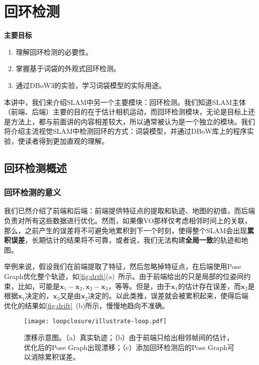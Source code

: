 \chapter{回环检测}
\begin{mdframed}  
	\textbf{主要目标}
	\begin{enumerate}[labelindent=0em,leftmargin=1.5em]
		\item 理解回环检测的必要性。
		\item 掌握基于词袋的外观式回环检测。
		\item 通过DBoW3的实验，学习词袋模型的实际用途。
	\end{enumerate}
\end{mdframed}

本讲中，我们来介绍SLAM中另一个主要模块：回环检测。我们知道SLAM主体（前端、后端）主要的目的在于估计相机运动，而回环检测模块，无论是目标上还是方法上，都与前面讲的内容相差较大，所以通常被认为是一个独立的模块。我们将介绍主流视觉SLAM中检测回环的方式：词袋模型，并通过DBoW库上的程序实验，使读者得到更加直观的理解。

\newpage


\newpage 

\section{回环检测概述}
\subsection{回环检测的意义}
我们已然介绍了前端和后端：前端提供特征点的提取和轨迹、地图的初值，而后端负责对所有这些数据进行优化。然而，如果像VO那样仅考虑相邻时间上的关联，那么，之前产生的误差将不可避免地累积到下一个时刻，使得整个SLAM会出现\textbf{累积误差}，长期估计的结果将不可靠，或者说，我们无法构建\textbf{全局一致}的轨迹和地图。

举例来说，假设我们在前端提取了特征，然后忽略掉特征点，在后端使用Pose Graph优化整个轨迹，如\autoref{fig:drift}(a)~所示。由于前端给出的只是局部的位姿间约束，比如，可能是$\bm{x}_1 - \bm{x}_2, \bm{x}_2-\bm{x}_3$，等等。但是，由于$\bm{x}_1$的估计存在误差，而$\bm{x}_2$是根据$\bm{x}_1$决定的，$\bm{x}_3$又是由$\bm{x}_2$决定的。以此类推，误差就会被累积起来，使得后端优化的结果如\autoref{fig:drift}~(b)所示，慢慢地趋向不准确。

\begin{figure}[!htp]
	\centering
	\texttt{[image: loopclosure/illustrate-loop.pdf]}
	\caption{漂移示意图。（a）真实轨迹；（b）由于前端只给出相邻帧间的估计，优化后的Pose Graph出现漂移；（c）添加回环检测后的Pose Graph可以消除累积误差。}
	\label{fig:drift}
\end{figure}


